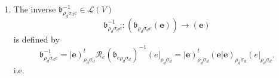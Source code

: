 \documentclass[aps,preprint]{revtex4}
\begin{document}
\begin{enumerate}
\begin{eqnarray}
\right) \left( 
\begin{array}{ccc}
\left( \left. e_{1}\right\vert e_{1}\right) _{\rho _{d}\sigma _{d}} & \cdots
& \left( \left. e_{1}\right\vert e_{r}\right) _{\rho _{d}\sigma _{d}} \\ 
\vdots & \ddots & \vdots \\ 
\left( \left. e_{r}\right\vert e_{1}\right) _{\rho _{d}\sigma _{d}} & \cdots
& \left( \left. e_{r}\right\vert e_{r}\right) _{\rho _{d}\sigma _{d}}%
\end{array}%
\right) ^{\boldsymbol{-}t}
\end{eqnarray}%
hence 
\begin{equation}
\mathfrak{b}_{e\rho _{d}\sigma _{d}}\left( 
\begin{array}{ccc}
e_{1} & \cdots & e_{r}%
\end{array}%
\right) =\left( 
\begin{array}{ccc}
\mathfrak{b}_{\rho _{d}\sigma _{d}e}\left( e_{1}\right) & \cdots & \mathfrak{%
b}_{\rho _{d}\sigma _{d}e}\left( e_{r}\right)%
\end{array}%
\right) =\left( 
\begin{array}{ccc}
e_{1} & \cdots & e_{r}%
\end{array}%
\right) \mathcal{R}_{e}\left( \mathfrak{b}_{e\rho _{d}\sigma _{d}}\right)
\end{equation}%
and thus 
\begin{equation}
\mathcal{R}_{e}\left( \mathfrak{b}_{e\rho _{d}\sigma _{d}}\right) =\left( 
\begin{array}{ccc}
\left( \left. e_{1}\right\vert e_{1}\right) _{\rho _{d}\sigma _{d}} & \cdots
& \left( \left. e_{1}\right\vert e_{r}\right) _{\rho _{d}\sigma _{d}} \\ 
\vdots & \ddots & \vdots \\ 
\left( \left. e_{r}\right\vert e_{1}\right) _{\rho _{d}\sigma _{d}} & \cdots
& \left( \left. e_{r}\right\vert e_{r}\right) _{\rho _{d}\sigma _{d}}%
\end{array}%
\right) ^{\boldsymbol{-}t}.
\end{equation}

\item The inverse $\mathfrak{b}_{\rho _{d}\sigma _{d}e}^{-1}\in \mathcal{L}%
\left( V\right) $ 
\begin{equation}
\mathfrak{b}_{\rho _{d}\sigma _{d}e}^{-1}:\left( \mathfrak{b}_{\rho
_{d}\sigma _{d}e}\left( \overset{}{\boldsymbol{e}}\right) \right)
\rightarrow \left( \boldsymbol{e}\right)
\end{equation}%
is defined by 
\begin{equation}
\mathfrak{b}_{\rho _{d}\sigma _{d}e}^{-1}=\left\vert \boldsymbol{e}\right)
_{\rho _{d}\sigma _{d}}^{t}\mathcal{R}_{e}\left( \mathfrak{b}_{e\rho
_{d}\sigma _{d}}\right) ^{-1}\left( e\right\vert _{\rho _{d}\sigma
_{d}}=\left\vert \boldsymbol{e}\right) _{\rho _{d}\sigma _{d}}^{t}\left(
\left. \boldsymbol{e}\right\vert \boldsymbol{e}\right) _{\rho _{d}\sigma
_{d}}\left( e\right\vert _{\rho _{d}\sigma _{d}}.
\end{equation}%
i.e.


\end{enumerate}
\end{document}
